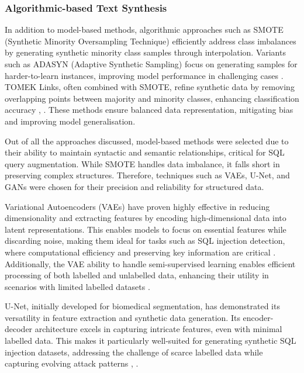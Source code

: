 \documentclass[journal]{IEEEtran}
\begin{document}
\subsubsection{Algorithmic-based Text Synthesis}
In addition to model-based methods, algorithmic approaches such as SMOTE (Synthetic Minority Oversampling Technique) \cite{chawla2002smote} efficiently address class imbalances by generating synthetic minority class samples through interpolation. Variants such as ADASYN (Adaptive Synthetic Sampling) focus on generating samples for harder-to-learn instances, improving model performance in challenging cases \cite{kaggle2022smote}. TOMEK Links, often combined with SMOTE, refine synthetic data by removing overlapping points between majority and minority classes, enhancing classification accuracy \cite{brandt2021comparative}, \cite{zeng2016effective}. These methods ensure balanced data representation, mitigating bias and improving model generalisation.

Out of all the approaches discussed, model-based methods were selected due to their ability to maintain syntactic and semantic relationships, critical for SQL query augmentation. While SMOTE handles data imbalance, it falls short in preserving complex structures. Therefore, techniques such as  VAEs, U-Net, and GANs were chosen for their precision and reliability for structured data.

Variational Autoencoders (VAEs) have proven highly effective in reducing dimensionality and extracting features by encoding high-dimensional data into latent representations. This enables models to focus on essential features while discarding noise, making them ideal for tasks such as SQL injection detection, where computational efficiency and preserving key information are critical \cite{zhang2022deep}. Additionally, the VAE ability to handle semi-supervised learning enables efficient processing of both labelled and unlabelled data, enhancing their utility in scenarios with limited labelled datasets \cite{san2019deep}.

U-Net, initially developed for biomedical segmentation, has demonstrated its versatility in feature extraction and synthetic data generation. Its encoder-decoder architecture excels in capturing intricate features, even with minimal labelled data. This makes it particularly well-suited for generating synthetic SQL injection datasets, addressing the challenge of scarce labelled data while capturing evolving attack patterns \cite{ronneberger2015u}, \cite{zheng2020conditional}.
\end{document}
